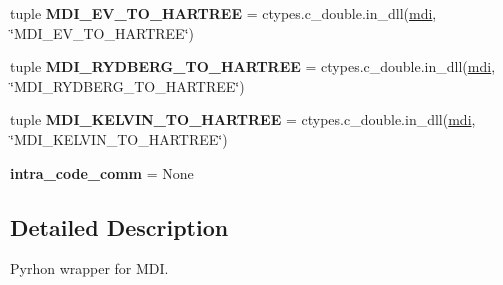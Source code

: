 \begin{DoxyCompactItemize}
\item 
\hypertarget{namespacemolssi__driver__interface_1_1mdi_ac13177eae2f4a37d788d8e1442b340dd}{tuple {\bfseries M\-D\-I\-\_\-\-E\-V\-\_\-\-T\-O\-\_\-\-H\-A\-R\-T\-R\-E\-E} = ctypes.\-c\-\_\-double.\-in\-\_\-dll(\hyperlink{classmdi}{mdi}, \char`\"{}M\-D\-I\-\_\-\-E\-V\-\_\-\-T\-O\-\_\-\-H\-A\-R\-T\-R\-E\-E\char`\"{})}\label{namespacemolssi__driver__interface_1_1mdi_ac13177eae2f4a37d788d8e1442b340dd}

\item 
\hypertarget{namespacemolssi__driver__interface_1_1mdi_afe9788e9e4cc752443059aea980d16f2}{tuple {\bfseries M\-D\-I\-\_\-\-R\-Y\-D\-B\-E\-R\-G\-\_\-\-T\-O\-\_\-\-H\-A\-R\-T\-R\-E\-E} = ctypes.\-c\-\_\-double.\-in\-\_\-dll(\hyperlink{classmdi}{mdi}, \char`\"{}M\-D\-I\-\_\-\-R\-Y\-D\-B\-E\-R\-G\-\_\-\-T\-O\-\_\-\-H\-A\-R\-T\-R\-E\-E\char`\"{})}\label{namespacemolssi__driver__interface_1_1mdi_afe9788e9e4cc752443059aea980d16f2}

\item 
\hypertarget{namespacemolssi__driver__interface_1_1mdi_a964195f72c62a67a99c43e1e25398a23}{tuple {\bfseries M\-D\-I\-\_\-\-K\-E\-L\-V\-I\-N\-\_\-\-T\-O\-\_\-\-H\-A\-R\-T\-R\-E\-E} = ctypes.\-c\-\_\-double.\-in\-\_\-dll(\hyperlink{classmdi}{mdi}, \char`\"{}M\-D\-I\-\_\-\-K\-E\-L\-V\-I\-N\-\_\-\-T\-O\-\_\-\-H\-A\-R\-T\-R\-E\-E\char`\"{})}\label{namespacemolssi__driver__interface_1_1mdi_a964195f72c62a67a99c43e1e25398a23}

\item 
\hypertarget{namespacemolssi__driver__interface_1_1mdi_a1dc45097ca1a63ea2cd91ac0fc0cfd12}{{\bfseries intra\-\_\-code\-\_\-comm} = None}\label{namespacemolssi__driver__interface_1_1mdi_a1dc45097ca1a63ea2cd91ac0fc0cfd12}

\end{DoxyCompactItemize}


\subsection{Detailed Description}
\begin{DoxyVerb}Pyrhon wrapper for MDI. \end{DoxyVerb}
 

